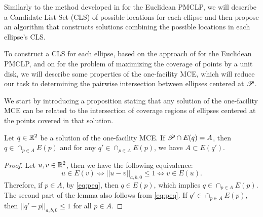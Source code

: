 Similarly to the method developed in \cite{church:1984} for the Euclidean PMCLP, we will describe a Candidate List Set (CLS) of possible locations for each ellipse and then propose an algorithm that constructs solutions combining the possible locations in each ellipse's CLS.

To construct a CLS for each ellipse, based on the approach of \cite{church:1984} for the Euclidean PMCLP, and on \cite{chazelle:1986} for the problem of maximizing the coverage of points by a unit disk, we will describe some properties of the one-facility MCE, which will reduce our task to determining the pairwise intersection between ellipses centered at $\mathscr{P}$.


We start by introducing a proposition stating that any solution of the one-facility MCE can be related to the intersection of coverage regions of ellipses centered at the points covered in that solution.


\begin{prp}\label{lema:mce-mwc}
	Let $q\in \mathbb{R}^2$ be a solution of the one-facility MCE. If $\mathscr{P} \cap E(q) = A$, then $q \in \cap_{p\in A} E(p)$ and for any $q' \in \cap_{p\in A} E(p)$, we have $A \subset E(q')$.
\end{prp}
\begin{proof}
	Let $u, v \in \mathbb{R}^2$, then we have the following equivalence:
	\begin{equation}\label{eq:peq}
	u \in E(v) \Leftrightarrow ||u-v||_{a, b, 0} \le 1 \Leftrightarrow v \in E(u).
	\end{equation}
	Therefore, if $p\in A$, by \autoref{eq:peq}, then $q \in E(p)$, which implies $q \in \cap_{p\in A} E(p)$.
	The second part of the lemma also follows from \autoref{eq:peq}. If $q' \in \cap_{p\in A} E(p)$, then $||q' - p||_{a,b,0} \le 1$ for all $p \in A$.
\end{proof}

